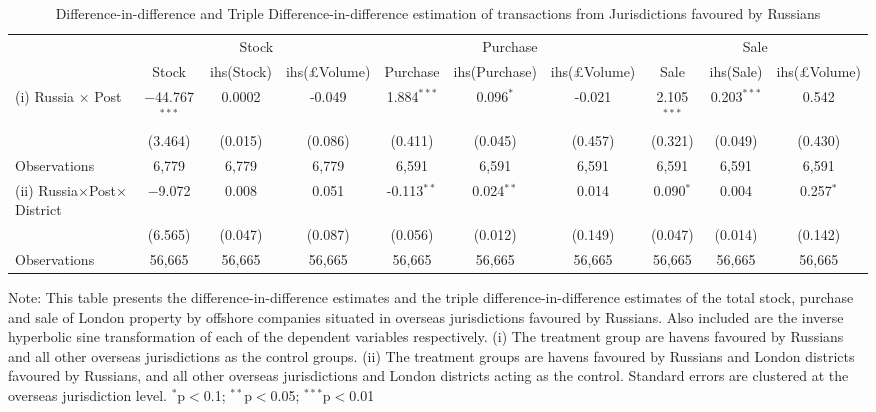 \documentclass{article}
\begin{document}
\begin{table}[H]
\caption{Difference-in-difference and Triple Difference-in-difference estimation of transactions from Jurisdictions favoured by Russians}
\label{yourLabelHere}
\centering
  \begin{adjustbox}{width=1.25\textwidth,center}
  \begin{threeparttable}
\begin{tabular}{@{}lccccccccc@{}}
\toprule
 & \multicolumn{3}{c}{Stock} & \multicolumn{3}{c}{Purchase} & \multicolumn{3}{c}{Sale} \\
\cmidrule(lr){2-4} \cmidrule(lr){5-7} \cmidrule(lr){8-10}
& Stock & ihs(Stock) & ihs(£Volume) & Purchase & ihs(Purchase) & ihs(£Volume) & Sale & ihs(Sale) & ihs(£Volume) \\
\midrule
(i) Russia $\times$ Post & $-$44.767$^{***}$ & 0.0002 & -0.049 & 1.884$^{***}$ & 0.096$^{*}$ & -0.021 & 2.105$^{***}$ & 0.203$^{***}$ & 0.542 \\
& (3.464) & (0.015) &  (0.086) & (0.411) & (0.045) & (0.457) & (0.321) & (0.049) & (0.430) \\
\midrule
Observations & 6,779 & 6,779 & 6,779 & 6,591 & 6,591 & 6,591 & 6,591 & 6,591 & 6,591 \\
\toprule
(ii) Russia$\times$Post$\times$District & $-$9.072 & 0.008 & 0.051 & -0.113$^{**}$ & 0.024$^{**}$ & 0.014 & 0.090$^{*}$ & 0.004 & 0.257$^{*}$ \\
& (6.565) & (0.047) & (0.087) & (0.056) & (0.012) & (0.149) & (0.047) & (0.014) & (0.142)\\
\midrule
Observations & 56,665 & 56,665 & 56,665 & 56,665 & 56,665 & 56,665 & 56,665 & 56,665 & 56,665 \\
\bottomrule
\end{tabular}
\begin{tablenotes}
\item
    Note: This table presents the difference-in-difference estimates and the triple difference-in-difference estimates of the total stock, purchase and sale of London property by offshore companies situated in overseas jurisdictions favoured by Russians. Also included are the inverse hyperbolic sine transformation of each of the dependent variables respectively. (i) The treatment group are havens favoured by Russians and all other overseas jurisdictions as the control groups. (ii) The treatment groups are havens favoured by Russians and London districts favoured by Russians, and all other overseas jurisdictions and London districts acting as the control. Standard errors are clustered at the overseas jurisdiction level. $^{*}$p$<$0.1; $^{**}$p$<$0.05; $^{***}$p$<$0.01
\end{tablenotes}
\end{threeparttable}
\end{adjustbox}
\end{table}
\end{document}
